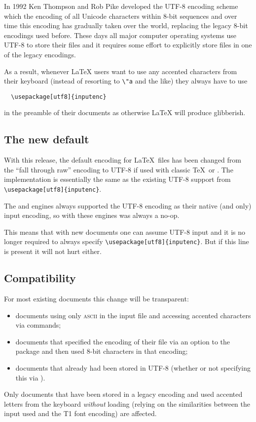 \documentclass{ltnews}
\providecommand\acro[1]{\textsc{#1}}
\begin{document}
In 1992 Ken Thompson and Rob Pike developed the UTF-8 encoding scheme
which the encoding of all Unicode characters within 8-bit sequences
and over time this encoding has gradually taken over the world,
replacing the legacy 8-bit encodings used before. These days all major
computer operating systems use UTF-8 to store their files and it
requires some effort to explicitly store files in one of the legacy
encodings.

As a result, whenever \LaTeX{} users want to use any accented
characters from their keyboard (instead of resorting to \verb=\"a= and
the like) they always have to use
\begin{verbatim}
  \usepackage[utf8]{inputenc}
\end{verbatim}
in the preamble of their documents as otherwise \LaTeX{} will produce
glibberish.

\subsection*{The new default}

With this release, the default encoding for \LaTeX\ files has been
changed from the ``fall through raw'' encoding to UTF-8 if used with
classic \TeX\ or . The implementation is essentially
the same as the existing UTF-8 support from
\verb|\usepackage[utf8]{inputenc}|.  

The  and  engines always supported the
UTF-8 encoding as their native (and only) input encoding, so with
these engines  was always a no-op.

This means that with new documents one can assume UTF-8 input and it
is no longer required to always specify
\verb|\usepackage[utf8]{inputenc}|. But if this line is present it
will not hurt either.


\subsection*{Compatibility}

For most existing documents this change will be transparent:
\begin{itemize}
\item documents using only \acro{ascii} in the input file and
  accessing accented characters via commands;
\item documents that specified the encoding of their file via an
  option to the  package and then used 8-bit
  characters in that encoding;
\item documents that already had been stored in UTF-8 (whether or not
  specifying this via ).
\end{itemize}
Only documents that have been stored in a legacy encoding and used
accented letters from the keyboard \emph{without} loading
 (relying on the similarities between the input used
and the T1 font encoding) are affected.
\end{document}
